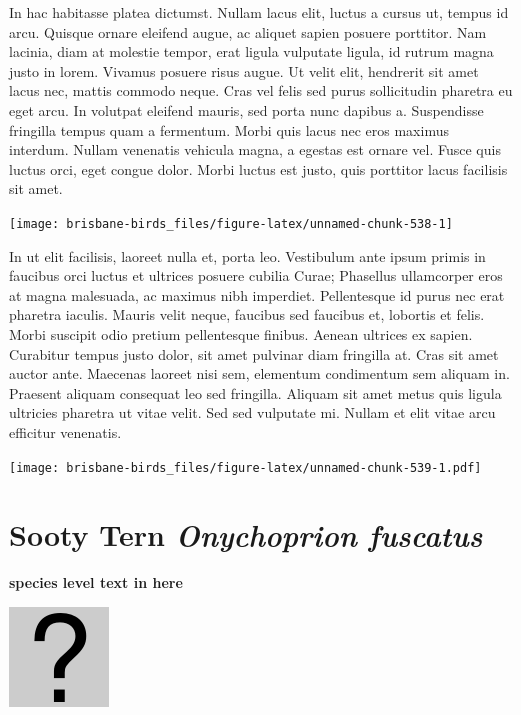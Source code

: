 \documentclass[]{book}
\let\origfigure\figure
\let\endorigfigure\endfigure
\renewenvironment{figure}[1][2] {
  \expandafter\origfigure\expandafter[H]
} {
  \endorigfigure
}
\begin{document}
In hac habitasse platea dictumst. Nullam lacus elit, luctus a cursus ut,
tempus id arcu. Quisque ornare eleifend augue, ac aliquet sapien posuere
porttitor. Nam lacinia, diam at molestie tempor, erat ligula vulputate
ligula, id rutrum magna justo in lorem. Vivamus posuere risus augue. Ut
velit elit, hendrerit sit amet lacus nec, mattis commodo neque. Cras vel
felis sed purus sollicitudin pharetra eu eget arcu. In volutpat eleifend
mauris, sed porta nunc dapibus a. Suspendisse fringilla tempus quam a
fermentum. Morbi quis lacus nec eros maximus interdum. Nullam venenatis
vehicula magna, a egestas est ornare vel. Fusce quis luctus orci, eget
congue dolor. Morbi luctus est justo, quis porttitor lacus facilisis sit
amet.

\begin{figure}
\texttt{[image: brisbane-birds\_files/figure-latex/unnamed-chunk-538-1]} \caption{insert figure caption}\label{fig:unnamed-chunk-538}
\end{figure}

In ut elit facilisis, laoreet nulla et, porta leo. Vestibulum ante ipsum
primis in faucibus orci luctus et ultrices posuere cubilia Curae;
Phasellus ullamcorper eros at magna malesuada, ac maximus nibh
imperdiet. Pellentesque id purus nec erat pharetra iaculis. Mauris velit
neque, faucibus sed faucibus et, lobortis et felis. Morbi suscipit odio
pretium pellentesque finibus. Aenean ultrices ex sapien. Curabitur
tempus justo dolor, sit amet pulvinar diam fringilla at. Cras sit amet
auctor ante. Maecenas laoreet nisi sem, elementum condimentum sem
aliquam in. Praesent aliquam consequat leo sed fringilla. Aliquam sit
amet metus quis ligula ultricies pharetra ut vitae velit. Sed sed
vulputate mi. Nullam et elit vitae arcu efficitur venenatis.

\begin{figure}
\centering
\texttt{[image: brisbane-birds\_files/figure-latex/unnamed-chunk-539-1.pdf]}
\caption{\label{fig:unnamed-chunk-539}insert figure caption}
\end{figure}

\section{\texorpdfstring{Sooty Tern \emph{Onychoprion
fuscatus}}{Sooty Tern Onychoprion fuscatus}}\label{sooty-tern-onychoprion-fuscatus}

\textbf{species level text in here}

\begin{figure}
\centering
\includegraphics{assets/missing.png}
\caption{No image for species}
\end{figure}
\end{document}
